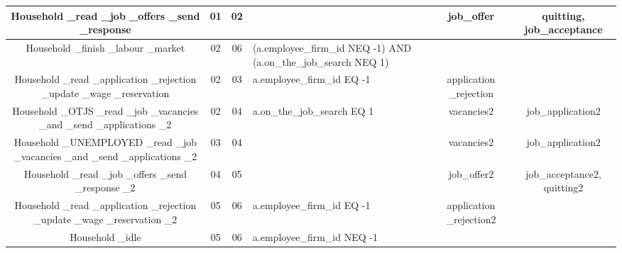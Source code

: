 \begin{landscape}
\begin{table}[!htb]
\begin{center}
\begin{tabular}{|c|c|c|l|c|c|}
\hline {\parbox[l]{5cm}{Household \_read \_job \_offers \_send
\_response}}& {\parbox[l]{3cm}{01}}& {\parbox[l]{3cm}{02}}&&
{\parbox[l]{3cm}{job\_offer}}
 & {\parbox[l]{3cm}{quitting, job\_acceptance}}
\\
\hline {\parbox[l]{5cm}{Household \_finish \_labour \_market}}&
{\parbox[l]{3cm}{02}}& {\parbox[l]{3cm}{06}}&
{\parbox[l]{3cm}{(a.employee\_firm\_id NEQ -1) AND
(a.on\_the\_job\_search NEQ 1)}}&  &
\\
\hline {\parbox[l]{5cm}{Household \_read \_application \_rejection
\_update \_wage \_reservation}}& {\parbox[l]{3cm}{02}}&
{\parbox[l]{3cm}{03}}& {\parbox[l]{3cm}{a.employee\_firm\_id EQ
-1}}& {\parbox[l]{3cm}{application \_rejection}} &
\\
\hline



{\parbox[l]{5cm}{Household \_OTJS \_read \_job \_vacancies \_and
\_send \_applications \_2}}& {\parbox[l]{3cm}{02}}&
{\parbox[l]{3cm}{04}}&{\parbox[l]{3cm}{a.on\_the\_job\_search EQ 1}}
 & {\parbox[l]{3cm}{vacancies2}}&{\parbox[l]{3cm}{job\_application2}}
\\

\hline

{\parbox[l]{5cm}{Household \_UNEMPLOYED \_read \_job \_vacancies
\_and \_send \_applications \_2}}& {\parbox[l]{3cm}{03}}&
{\parbox[l]{3cm}{04}}& & {\parbox[l]{3cm}{vacancies2}}&
{\parbox[l]{3cm}{job\_application2}}
\\
\hline {\parbox[l]{5cm}{Household \_read \_job \_offers \_send
\_response \_2}}& {\parbox[l]{3cm}{04}}& {\parbox[l]{3cm}{05}}&
 &{\parbox[l]{3cm}{job\_offer2}} &{\parbox[l]{3cm}{job\_acceptance2, quitting2}}
\\

\hline {\parbox[l]{5cm}{Household \_read \_application \_rejection
\_update \_wage \_reservation \_2}}& {\parbox[l]{3cm}{05}}&
{\parbox[l]{3cm}{06}}&{\parbox[l]{3cm}{a.employee\_firm\_id EQ -1}}
 & {\parbox[l]{3cm}{application \_rejection2}}&
\\

\hline {\parbox[l]{5cm}{Household \_idle}}& {\parbox[l]{3cm}{05}}&
{\parbox[l]{3cm}{06}}&{\parbox[l]{3cm}{a.employee\_firm\_id NEQ -1}}
 & &
 \\
\hline



\end{tabular}\end{center}\label{tab:labourhh}
\end{table}
\end{landscape}

